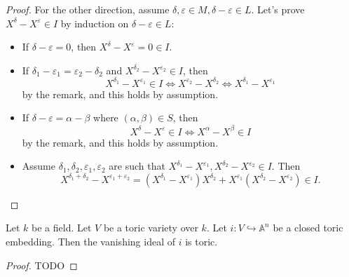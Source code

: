 \begin{proof}
  For the other direction, assume $\delta, \varepsilon \in M, \delta - \varepsilon \in L$.
  Let's prove $X^\delta - X^\varepsilon \in I$ by induction on $\delta - \varepsilon \in L$:
  \begin{itemize}
    \item If $\delta - \varepsilon = 0$, then $X^\delta - X^\varepsilon = 0 \in I$.
    \item If $\delta_1 - \varepsilon_1 = \varepsilon_2 - \delta_2$
      and $X^{\delta_2} - X^{\varepsilon_2} \in I$, then
      \[
        X^{\delta_1} - X^{\varepsilon_1} \in I \iff X^{\varepsilon_2} - X^{\delta_2}
          \iff X^{\delta_1} - X^{\varepsilon_1}
      \]
      by the remark, and this holds by assumption.
    \item If $\delta - \varepsilon = \alpha - \beta$ where $(\alpha, \beta) \in S$, then
      \[
        X^\delta - X^\varepsilon \in I \iff X^\alpha - X^\beta \in I
      \]
      by the remark, and this holds by assumption.
    \item Assume $\delta_1, \delta_2, \varepsilon_1, \varepsilon_2$ are such that
      $X^{\delta_1} - X^{\varepsilon_1}, X^{\delta_2} - X^{\varepsilon_2} \in I$.
      Then
      \[
        X^{\delta_1 + \delta_2} - X^{\varepsilon_1 + \varepsilon_2}
          = (X^{\delta_1} - X^{\varepsilon_1})X^{\delta_2}
            + X^{\varepsilon_1}(X^{\delta_2} - X^{\varepsilon_2})
          \in I.
      \]
  \end{itemize}
\end{proof}


\begin{proposition}
  \label{5-3-van-tor-emb}

  Let $k$ be a field.
  Let $V$ be a toric variety over $k$.
  Let $i : V \hookrightarrow \mathbb{A}^n$ be a closed toric embedding.
  Then the vanishing ideal of $i$ is toric.
\end{proposition}
\begin{proof}

  TODO
\end{proof}


